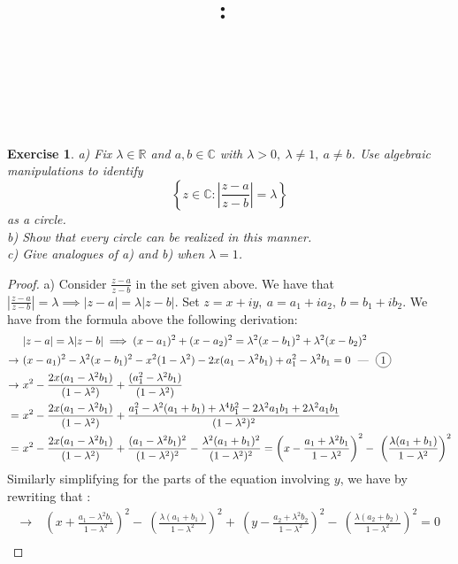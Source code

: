 \documentclass{article}
\title{
    \vspace{2in}
    \textmd{\textbf{\hmwkClass:\ \hmwkTitle}}\\
    \vspace{0.1in}
    \textmd{\hmwkDueDate} \\
    \vspace{0.2in}\large{\textit{\hmwkClassInstructor\  }}
    \vspace{2in}
}
\author{\hmwkAuthorName}
\date{}
\newcommand*\circled[1]{\tikz[baseline=(char.base)]{
            \node[shape=circle,draw,inner sep=2pt] (char) {#1};}}
\newcommand{\bb}[1]{\mathbb{#1}}
\newtheorem{exercise}{Exercise}
\begin{document}
\maketitle
\newpage
\begin{exercise}
  a) Fix $\lambda \in \bb{R}$ and $a,b \in \bb{C}$ with $\lambda > 0, \ \lambda \neq 1, \ a \neq b$. Use algebraic manipulations to identify \[ \left\{ z \in \bb{C} : \left| \frac{z-a}{z-b} \right| = \lambda\right\} \] as a circle.\\
  b) Show that every circle can be realized in this manner. \\
  c) Give analogues of a) and b) when $\lambda = 1$.
\end{exercise}
\begin{proof}
 a) Consider $\frac{z-a}{z-b}$ in the set given above. We have that $|\frac{z-a}{z-b}| = \lambda \implies |z-a| = \lambda |z-b|$. Set $z = x + iy, \ a = a_{1} + ia_{2}, \ b = b_{1} + ib_{2}$. We have from the formula above the following derivation:
  \begin{align*}
    & |z-a| = \lambda |z-b | \implies (x-a_{1})^{2} + (x-a_{2})^{2} = \lambda^{2}(x-b_{1})^{2} + \lambda^{2}(x-b_{2})^{2} \\
    \rightarrow \ & (x-a_{1})^{2} - \lambda^{2}(x-b_{1})^{2} - x^{2}(1-\lambda^{2}) - 2x(a_{1} - \lambda^{2}b_{1}) + a_{1}^{2} - \lambda^{2}b_{1} = 0 \text{ \ --- \ } \circled{1} \\
    \rightarrow \ &  x^{2} - \frac{2x(a_{1} - \lambda^{2}b_{1})}{(1-\lambda^{2})} +  \frac{(a_{1}^{2} - \lambda^{2}b_{1})}{(1-\lambda^{2})} \\
    = \ & x^{2} - \frac{2x(a_{1} - \lambda^{2}b_{1})}{(1-\lambda^{2})} +  \frac{a_{1}^{2} - \lambda^{2}(a_{1} + b_{1}) +\lambda^{4}b_{1}^{2} - 2\lambda^{2}a_{1}b_{1} + 2\lambda^{2}a_{1}b_{1}}{(1-\lambda^{2})^{2}} \\
    = \ & x^{2} - \frac{2x(a_{1} - \lambda^{2}b_{1})}{(1-\lambda^{2})} +  \frac{(a_{1}-\lambda^{2}b_{1})^{2}}{(1-\lambda^{2})^{2}} - \frac{\lambda^{2}(a_{1} + b_{1})^{2}}{(1-\lambda^{2})^{2}} = \left(x - \frac{a_{1} + \lambda^{2}b_{1}}{1-\lambda^{2}}\right) ^{2} - \ \left(\frac{\lambda(a_{1} + b_{1})}{1-\lambda^{2}}\right)^{2}
\end{align*}
Similarly simplifying for the parts of the equation involving $y$, we have by rewriting \circled{1} that :
\begin{align*}
  \rightarrow \ &\left(x + \frac{a_{1} - \lambda^{2}b_{1}}{1-\lambda^{2}}\right) ^{2} - \ \left(\frac{\lambda(a_{1} + b_{1})}{1-\lambda^{2}}\right)^{2} + \ \left(y - \frac{a_{2} + \lambda^{2}b_{2}}{1-\lambda^{2}}\right) ^{2} - \  \left(\frac{\lambda(a_{2} + b_{2})}{1-\lambda^{2}}\right)^{2} = 0 \\

\end{align*}
\end{proof}
\end{document}
